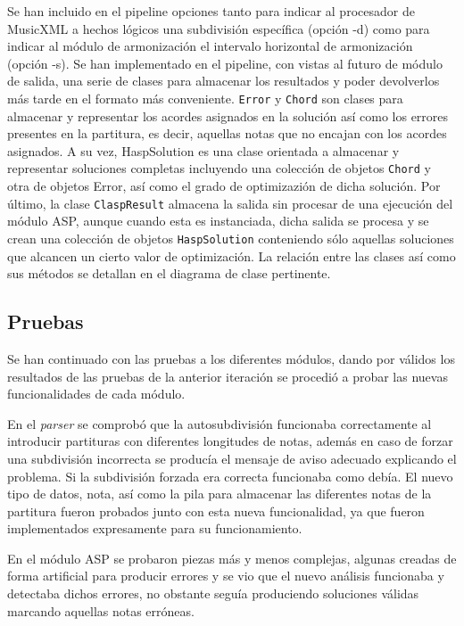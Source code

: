 Se han incluido en el pipeline opciones tanto para indicar al procesador de MusicXML a hechos lógicos una subdivisión específica (opción -d) como para indicar al módulo de armonización el intervalo horizontal de armonización (opción -s). Se han implementado en el pipeline, con vistas al futuro de módulo de salida, una serie de clases para almacenar los resultados y poder devolverlos más tarde en el formato más conveniente. \texttt{Error} y \texttt{Chord} son clases para almacenar y representar los acordes asignados en la solución así como los errores presentes en la partitura, es decir, aquellas notas que no encajan con los acordes asignados. A su vez, HaspSolution es una clase orientada a almacenar y representar soluciones completas incluyendo una colección de objetos \texttt{Chord} y otra de objetos Error, así como el grado de optimizazión de dicha solución. Por último, la clase \texttt{ClaspResult} almacena la salida sin procesar de una ejecución del módulo ASP, aunque cuando esta es instanciada, dicha salida se procesa y se crean una colección de objetos \texttt{HaspSolution} conteniendo sólo aquellas soluciones que alcancen un cierto valor de optimización. La relación entre las clases así como sus métodos se detallan en el diagrama de clase pertinente.

\subsection{Pruebas}
Se han continuado con las pruebas a los diferentes módulos, dando por válidos los resultados de las pruebas de la anterior iteración se procedió a probar las nuevas funcionalidades de cada módulo.

En el \textit{parser} se comprobó que la autosubdivisión funcionaba correctamente al introducir partituras con diferentes longitudes de notas, además en caso de forzar una subdivisión incorrecta se producía el mensaje de aviso adecuado explicando el problema. Si la subdivisión forzada era correcta funcionaba como debía. El nuevo tipo de datos, nota, así como la pila para almacenar las diferentes notas de la partitura fueron probados junto con esta nueva funcionalidad, ya que fueron implementados expresamente para su funcionamiento.

En el módulo ASP se probaron piezas más y menos complejas, algunas creadas de forma artificial para producir errores y se vio que el nuevo análisis funcionaba y detectaba dichos errores, no obstante seguía produciendo soluciones válidas marcando aquellas notas erróneas.

